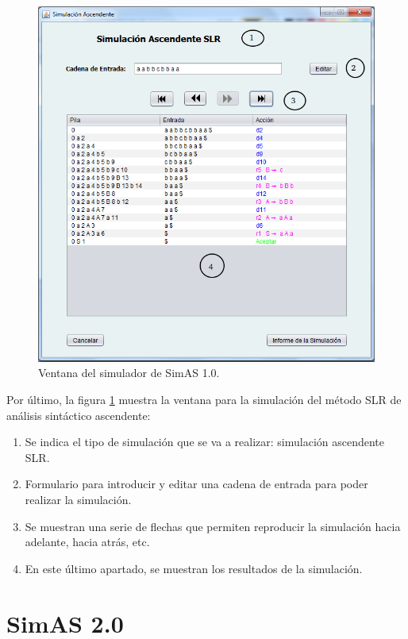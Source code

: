 \begin{figure}[!t]
 	\begin{center}
      \includegraphics[scale=0.40]{figuras/Cap3/da14.png} 
       \caption{Ventana del simulador de SimAS 1.0.}\label{fig:SimAS-1.0-simulador}
 	\end{center}
\end{figure}

Por último, la figura \ref{fig:SimAS-1.0-simulador} muestra la ventana para la simulación del método SLR de análisis sintáctico ascendente:
\begin{enumerate}
     \item Se indica el tipo de simulación que se va a realizar: simulación ascendente SLR.
     \item Formulario para introducir y editar una cadena de entrada para poder realizar la simulación.
     \item Se muestran una serie de flechas que permiten reproducir la simulación hacia adelante, hacia atrás, etc.
     \item En este último apartado, se muestran los resultados de la simulación.
\end{enumerate}


\section{SimAS 2.0}\label{sec:SimAs2.0}

